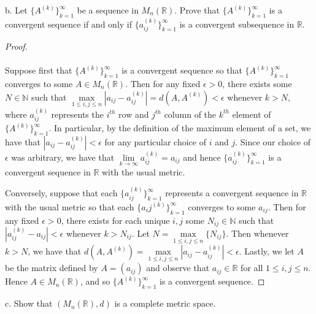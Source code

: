     \pagebreak

b.  Let $\{A^{(k)}\}_{k=1}^{\infty}$ be a sequence in $M_n(\mathbb{R})$. Prove that $\{A^{(k)}\}_{k=1}^{\infty}$ is a
    convergent sequence if and only if $\{a_{ij}^{(k)}\}_{k=1}^{\infty}$ is a convergent subsequence in $\mathbb{R}$.\ \\

    \begin{proof}\renewcommand{\qedsymbol}{}\ \\\\
        Suppose first that $\{A^{(k)}\}_{k=1}^{\infty}$ is a convergent sequence so that $\{A^{(k)}\}_{k=1}^{\infty}$ 
        converges to some $A \in M_n(\mathbb{R})$. Then for any fixed $\epsilon > 0$, there exists some 
        $N \in \mathbb{N}$ such that $\max\limits_{1 \le i,j \le n}{|a_{ij} - a^{(k)}_{ij}|} = d(A, A^{(k)}) < \epsilon$
        whenever $k > N$, where $a_{ij}^{(k)}$ represents the $i^{th}$ row and $j^{th}$ column of the $k^{th}$ element 
        of $\{A^{(k)}\}_{k=1}^{\infty}$. In particular, by the definition of the maximum element of a set, we have that 
        $|a_{ij} - a_{ij}^{(k)}| < \epsilon$ for any particular choice of $i$ and $j$. Since our choice of $\epsilon$ 
        was arbitrary, we have that $\lim\limits_{k \to \infty}{a_{ij}^{(k)} = a_{ij}}$ and hence 
        $\{a_{ij}^{(k)}\}_{k=1}^{\infty}$ is a convergent sequence in $\mathbb{R}$ with the usual metric.
        
        Conversely, suppose that each $\{a_{ij}^{(k)}\}_{k=1}^{\infty}$ represents a convergent sequence in $\mathbb{R}$
        with the usual metric so that each $\{a_ij^{(k)}\}_{k=1}^{\infty}$ converges to some $a_{ij}$. Then for any 
        fixed $\epsilon > 0$, there exists for each unique $i, j$ some $N_{ij} \in \mathbb{N}$ such that 
        $|a_{ij}^{(k)} - a_{ij}| < \epsilon$ whenever $k > N_{ij}$. Let $N = \max\limits_{1 \le i,j \le n}{\{N_{ij}\}}$.
        Then whenever $k > N$, we have that 
        $d(A, A^{(k)}) = \max\limits_{1 \le i,j \le n}{|a_{ij} - a^{(k)}_{ij}|} < \epsilon$. Lastly, we let 
        $A$ be the matrix defined by $A = \left(a_{ij}\right)$ and observe that $a_{ij} \in \mathbb{R}$ for all
        $1 \le i,j \le n$. Hence $A \in M_n(\mathbb{R})$, and so $\{A^{(k)}\}_{k=1}^{\infty}$ is a convergent sequence.
    \end{proof}

    \pagebreak

c.  Show that $\left(M_n(\mathbb{R}), d\right)$ is a complete metric space.

